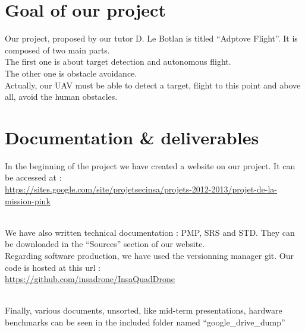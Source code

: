 \section{Goal of our project}

Our project, proposed by our tutor D. Le Botlan is titled ``Adptove Flight''.
It is composed of two main parts.\\

The first one is about target detection and autonomous flight.\\
The other one is obstacle avoidance.\\

Actually, our UAV must be able to detect a target, flight to this point and above all, avoid the human obstacles.\\

\section{Documentation \& deliverables}

In the beginning of the project we have created a website on our project. It can be accessed at :\\

\url{https://sites.google.com/site/projetsecinsa/projets-2012-2013/projet-de-la-mission-pink}

~~\\

We have also written technical documentation : PMP, SRS and STD. They can be downloaded in the ``Sources'' section of our website.\\

Regarding software production, we have used the versionning manager git. Our code is hosted at this url :\\

\url{https://github.com/insadrone/InsaQuadDrone}

~~\\

Finally, various documents, unsorted, like mid-term presentations, hardware benchmarks can be seen in the included folder named ``google\_drive\_dump''




